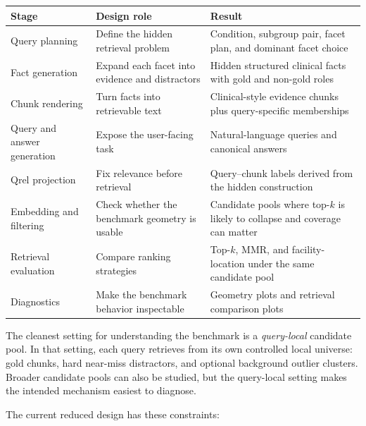 \documentclass[11pt,a4paper]{article}
\begin{document}
\begingroup
\renewcommand{\arraystretch}{1.15}
\begin{center}
	\begin{tabular}{@{}p{3.1cm}p{5.4cm}p{5.8cm}@{}}
		\toprule
		\textbf{Stage} & \textbf{Design role} & \textbf{Result} \\
		\midrule
		Query planning & Define the hidden retrieval problem & Condition, subgroup pair, facet plan, and dominant facet choice \\
		Fact generation & Expand each facet into evidence and distractors & Hidden structured clinical facts with gold and non-gold roles \\
		Chunk rendering & Turn facts into retrievable text & Clinical-style evidence chunks plus query-specific memberships \\
		Query and answer generation & Expose the user-facing task & Natural-language queries and canonical answers \\
		Qrel projection & Fix relevance before retrieval & Query--chunk labels derived from the hidden construction \\
		Embedding and filtering & Check whether the benchmark geometry is usable & Candidate pools where top-$k$ is likely to collapse and coverage can matter \\
		Retrieval evaluation & Compare ranking strategies & Top-$k$, MMR, and facility-location under the same candidate pool \\
		Diagnostics & Make the benchmark behavior inspectable & Geometry plots and retrieval comparison plots \\
		\bottomrule
	\end{tabular}
\end{center}
\endgroup

The cleanest setting for understanding the benchmark is a \emph{query-local} candidate pool. In that setting, each query retrieves from its own controlled local universe: gold chunks, hard near-miss distractors, and optional background outlier clusters. Broader candidate pools can also be studied, but the query-local setting makes the intended mechanism easiest to diagnose.

The current reduced design has these constraints:
\end{document}
